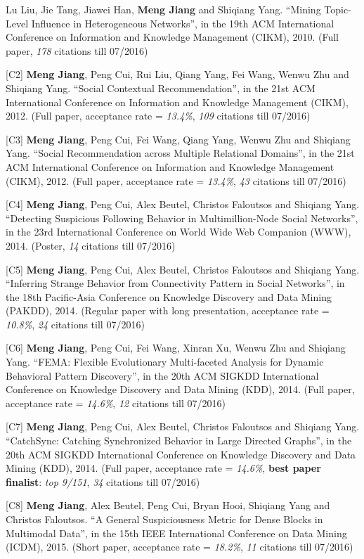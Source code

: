 \documentclass[margin, 10pt]{res} %
\begin{document}
\begin{resume}
[C1] Lu Liu, Jie Tang, Jiawei Han, {\bf Meng Jiang} and Shiqiang Yang. ``Mining Topic-Level Influence in Heterogeneous Networks'', in the 19th ACM International Conference on Information and Knowledge Management (CIKM), 2010. (Full paper, {\em 178} citations till 07/2016)

[C2] {\bf Meng Jiang}, Peng Cui, Rui Liu, Qiang Yang, Fei Wang, Wenwu Zhu and Shiqiang Yang. ``Social Contextual Recommendation'', in the 21st ACM International Conference on Information and Knowledge Management (CIKM), 2012. (Full paper, acceptance rate = {\em 13.4\%}, {\em 109} citations till 07/2016)

[C3] {\bf Meng Jiang}, Peng Cui, Fei Wang, Qiang Yang, Wenwu Zhu and Shiqiang Yang. ``Social Recommendation across Multiple Relational Domains'', in the 21st ACM International Conference on Information and Knowledge Management (CIKM), 2012. (Full paper, acceptance rate = {\em 13.4\%}, {\em 43} citations till 07/2016)

[C4] {\bf Meng Jiang}, Peng Cui, Alex Beutel, Christos Faloutsos and Shiqiang Yang. ``Detecting Suspicious Following Behavior in Multimillion-Node Social Networks'', in the 23rd International Conference on World Wide Web Companion (WWW), 2014. (Poster, {\em 14} citations till 07/2016)

[C5] {\bf Meng Jiang}, Peng Cui, Alex Beutel, Christos Faloutsos and Shiqiang Yang. ``Inferring Strange Behavior from Connectivity Pattern in Social Networks'', in the 18th Pacific-Asia Conference on Knowledge Discovery and Data Mining (PAKDD), 2014. (Regular paper with long presentation, acceptance rate = {\em 10.8\%}, {\em 24} citations till 07/2016)

[C6] {\bf Meng Jiang}, Peng Cui, Fei Wang, Xinran Xu, Wenwu Zhu and Shiqiang Yang. ``FEMA: Flexible Evolutionary Multi-faceted Analysis for Dynamic Behavioral Pattern Discovery'', in the 20th ACM SIGKDD International Conference on Knowledge Discovery and Data Mining (KDD), 2014. (Full paper, acceptance rate = {\em 14.6\%}, {\em 12} citations till 07/2016)

[C7] {\bf Meng Jiang}, Peng Cui, Alex Beutel, Christos Faloutsos and Shiqiang Yang. ``CatchSync: Catching Synchronized Behavior in Large Directed Graphs'', in the 20th ACM SIGKDD International Conference on Knowledge Discovery and Data Mining (KDD), 2014. (Full paper, acceptance rate = {\em 14.6\%}, {\bf best paper finalist}: {\em top 9/151}, {\em 34} citations till 07/2016)

[C8] {\bf Meng Jiang}, Alex Beutel, Peng Cui, Bryan Hooi, Shiqiang Yang and Christos Faloutsos. ``A General Suspiciousness Metric for Dense Blocks in Multimodal Data'', in the 15th IEEE International Conference on Data Mining (ICDM), 2015. (Short paper, acceptance rate = {\em 18.2\%}, {\em 11} citations till 07/2016)


\end{resume}
\end{document}
